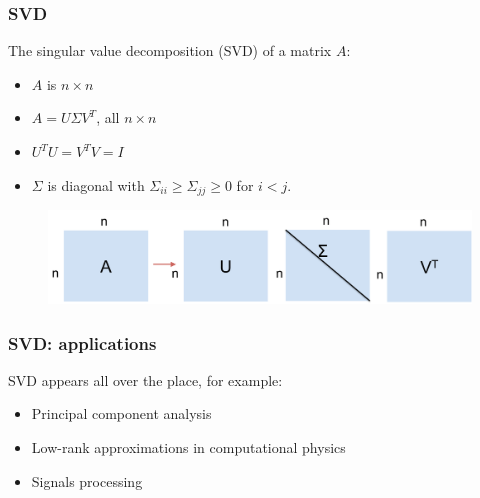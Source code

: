 \documentclass{beamer}
\begin{document}
\begin{frame}
\frametitle{SVD}

The singular value decomposition (SVD) of a matrix $A$:
\begin{itemize}
\item $A$ is $n \times n$
\item $A = U\Sigma V^T$, all $n \times n$
\item $U^TU = V^TV = I$
\item $\Sigma$ is diagonal with $\Sigma_{ii} \ge \Sigma_{jj} \ge 0$ for $i < j$.
\end{itemize}

\begin{figure}
\includegraphics[scale=0.4]{figs/svd.pdf}
\end{figure}

\end{frame}

\begin{frame}
\frametitle{SVD: applications}

SVD appears all over the place, for example:

\vspace{1cm}

\begin{itemize}
\item Principal component analysis
\item Low-rank approximations in computational physics
\item Signals processing
\end{itemize}

\end{frame}
\end{document}
